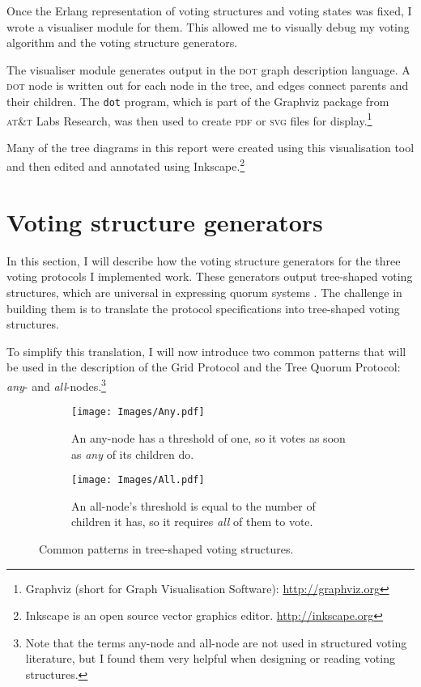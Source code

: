 \documentclass[11pt,chapterprefix=true,toc=bibliography,numbers=noendperiod,
               footnotes=multiple,twoside]{scrreprt}
\begin{document}
Once the Erlang representation of voting structures and voting states was fixed, I wrote a visualiser module for them. This allowed me to visually debug my voting algorithm and the voting structure generators.

The visualiser module generates output in the \textsc{dot} graph description language. A \textsc{dot} node is written out for each node in the tree, and edges connect parents and their children. The \texttt{dot} program, which is part of the Graphviz package from \textsc{at\&t} Labs Research, was then used to create \textsc{pdf} or \textsc{svg} files for display.\footnote{Graphviz (short for Graph Visualisation Software): \url{http://graphviz.org}}

Many of the tree diagrams in this report were created using this visualisation tool and then edited and annotated using Inkscape.\footnote{Inkscape is an open source vector graphics editor. \url{http://inkscape.org}}

\section{Voting structure generators\label{sc:voting}}

In this section, I will describe how the voting structure generators for the three voting protocols I implemented work. These generators output tree-shaped voting structures, which are universal in expressing quorum systems \autocite{structures}. The challenge in building them is to translate the protocol specifications into tree-shaped voting structures.

To simplify this translation, I will now introduce two common patterns that will be used in the description of the Grid Protocol and the Tree Quorum Protocol: \emph{any}- and \emph{all}-nodes.\footnote{Note that the terms any-node and all-node are not used in structured voting literature, but I found them very helpful when designing or reading voting structures.}

\begin{figure}[h]
    \centering
    \begin{subfigure}[t]{0.4\textwidth}
        \texttt{[image: Images/Any.pdf]}
        \caption{An any-node has a threshold of one, so it votes as soon as \emph{any} of its children do.}
        \label{fig:any}
    \end{subfigure}
    \quad
    \begin{subfigure}[t]{0.4\textwidth}
        \texttt{[image: Images/All.pdf]}
        \caption{An all-node's threshold is equal to the number of children it has, so it requires \emph{all} of them to vote.}
        \label{fig:all}
    \end{subfigure}
    \caption{Common patterns in tree-shaped voting structures.}
    \label{fig:tsvs-patterns}
\end{figure}
\end{document}
